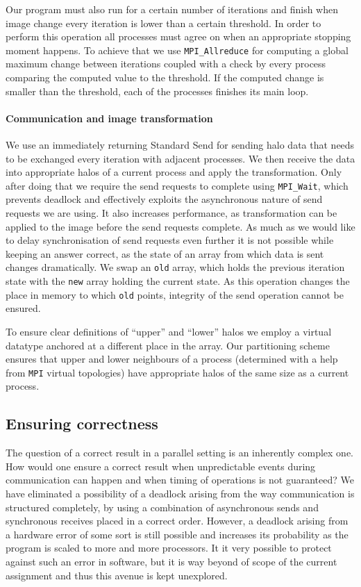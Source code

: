 \documentclass[11pt,a4paper]{article}
\begin{document}
Our program must also run for a certain number of iterations and finish when image change every iteration is lower than a certain threshold.
In order to perform this operation all processes must agree on when an appropriate stopping moment happens.
To achieve that we use \texttt{MPI\_Allreduce} for computing a global maximum change between iterations coupled with a check by every process comparing the computed value to the threshold.
If the computed change is smaller than the threshold, each of the processes finishes its main loop.

\paragraph{Communication and image transformation}
We use an immediately returning Standard Send for sending halo data that needs to be exchanged every iteration with adjacent processes.
We then receive the data into appropriate halos of a current process and apply the transformation. 
Only after doing that we require the send requests to complete using \texttt{MPI\_Wait}, which prevents deadlock and effectively exploits the asynchronous nature of send requests we are using.
It also increases performance, as transformation can be applied to the image before the send requests complete.
As much as we would like to delay synchronisation of send requests even further it is not possible while keeping an answer correct, as the state of an array from which data is sent changes dramatically.
We swap an \texttt{old} array, which holds the previous iteration state with the \texttt{new} array holding the current state.
As this operation changes the place in memory to which \texttt{old} points, integrity of the send operation cannot be ensured.

To ensure clear definitions of ``upper'' and ``lower'' halos we employ a virtual datatype anchored at a different place in the array.
Our partitioning scheme ensures that upper and lower neighbours of a process (determined with a help from \texttt{MPI} virtual topologies) have appropriate halos of the same size as a current process.

\subsection{Ensuring correctness}
The question of a correct result in a parallel setting is an inherently complex one. 
How would one ensure a correct result when unpredictable events during communication can happen and when timing of operations is not guaranteed?
We have eliminated a possibility of a deadlock arising from the way communication is structured completely, by using a combination of asynchronous sends and synchronous receives placed in a correct order.
However, a deadlock arising from a hardware error of some sort is still possible and increases its probability as the program is scaled to more and more processors.
It it very possible to protect against such an error in software, but it is way beyond of scope of the current assignment and thus this avenue is kept unexplored.
\end{document}
